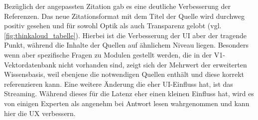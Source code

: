 Bezüglich der angepassten Zitation gab es eine deutliche Verbesserung der Referenzen.
Das neue Zitationsformat mit dem Titel der Quelle wird durchweg positiv gesehen und für sowohl Optik als auch Transparenz gelobt (vgl. \autoref{fig:thinkaloud_tabelle}).
Hierbei ist die Verbesserung der UI aber der tragende Punkt, während die Inhalte der Quellen auf ähnlichem Niveau liegen.
Besonders wenn aber spezifische Fragen zu Modulen gestellt werden, die in der V1-Vektordatenbank nicht vorhanden sind, zeigt sich der Mehrwert der erweiterten Wissensbasis, weil ebenjene die notwendigen Quellen enthält und diese korrekt referenzieren kann.
Eine weitere Änderung die eher UI-Einfluss hat, ist das Streaming.
Während dieses für die Latenz eher einen kleinen Einfluss hat, wird es von einigen Experten als angenehm bei Antwort lesen wahrgenommen und kann hier die UX verbessern.